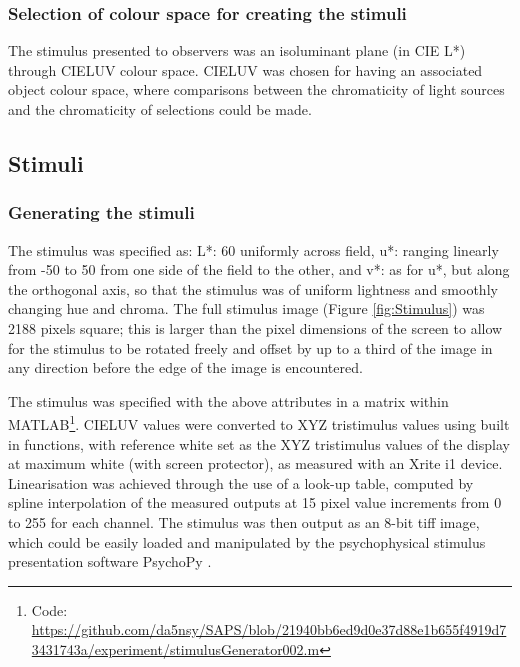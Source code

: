 \subsubsection{Selection of colour space for creating the stimuli}

The stimulus presented to observers was an isoluminant plane (in CIE L*) through CIELUV colour space. CIELUV was chosen for having an associated object colour space, where comparisons between the chromaticity of light sources and the chromaticity of selections could be made. 

\subsection{Stimuli} \label{sec:stimuli}
\subsubsection{Generating the stimuli}

The stimulus was specified as: L*: 60 uniformly across field, u*: ranging linearly from -50 to 50 from one side of the field to the other, and v*: as for u*, but along the orthogonal axis, so that the stimulus was of uniform lightness and smoothly changing hue and chroma. The full stimulus image (Figure \ref{fig:Stimulus}) was 2188 pixels square; this is larger than the pixel dimensions of the screen to allow for the stimulus to be rotated freely and offset by up to a third of the image in any direction before the edge of the image is encountered. 

The stimulus was specified with the above attributes in a matrix within MATLAB\footnote{Code: \url{https://github.com/da5nsy/SAPS/blob/21940bb6ed9d0e37d88e1b655f4919d73431743a/experiment/stimulusGenerator002.m}}. CIELUV values were converted to XYZ tristimulus values using built in functions, with reference white set as the XYZ tristimulus values of the display at maximum white (with screen protector), as measured with an Xrite i1 device. Linearisation was achieved through the use of a look-up table, computed by spline interpolation of the measured outputs at 15 pixel %
value increments from 0 to 255 for each channel. The stimulus was then output as an 8-bit tiff image, which could be easily loaded and manipulated by the psychophysical stimulus presentation software PsychoPy \citep{peirce_psychopypsychophysics_2007}. %

